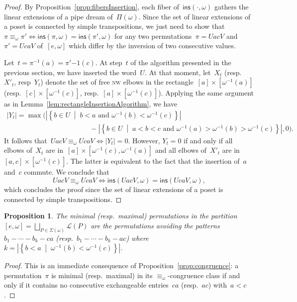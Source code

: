 \documentclass{amsart}
\newtheorem{proposition}[theorem]{Proposition}
\theoremstyle{definition}
\newcommand{\set}[2]{\left\{ #1 \;\middle|\; #2 \right\}} %
\newcommand{\pipeDreams}{\Pi} %
\newcommand{\nw}{\textsc{nw}} %
\newcommand{\insertion}[2]{\mathsf{ins}(#1,#2)} %
\newcommand{\acyclicPipeDreams}{\Sigma} %
\newcommand{\linearExtensions}{\mathcal{L}} %
\begin{document}
\begin{proof}
By Proposition~\ref{prop:fibersInsertion}, each fiber of~$\insertion{\cdot}{\omega}$ gathers the linear extensions of a pipe dream of~$\pipeDreams(\omega)$. Since the set of linear extensions of a poset is connected by simple transpositions, we just need to show that~$\pi \equiv_\omega \pi' \!\iff\! \insertion{\pi}{\omega} = \insertion{\pi'}{\omega}$ for any two permutations~$\pi = UacV$ and~$\pi' = UcaV$ of~$[e,\omega]$ which differ by the inversion of two consecutive values.

Let~$t = \pi^{-1}(a) = \pi'{-1}(c)$. At step~$t$ of the algorithm presented in the previous section, we have inserted the word~$U$. At that moment, let~$X_t$ (resp.~$X'_t$, resp~$Y_t$) denote the set of free \nw{} elbows in the rectangle~$[a] \times [\omega^{-1}(a)]$ (resp.~$[c] \times [\omega^{-1}(c)]$, resp.~$[a] \times [\omega^{-1}(c)]$). Applying the same argument as in Lemma~\ref{lem:rectangleInsertionAlgorithm}, we have
\begin{gather*}
|Y_t| = \max\big( |\set{b \in U}{b < a \text{ and } \omega^{-1}(b) < \omega^{-1}(c)}| \hspace{5cm} \\ \hspace{5cm} - |\set{b \in U}{a < b < c \text{ and } \omega^{-1}(a) > \omega^{-1}(b) > \omega^{-1}(c)}|, 0\big).
\end{gather*}
It follows that~$U ac V \equiv_\omega U ca V \iff |Y_t| = 0$. However, $Y_t = 0$ if and only if all elbows of~$X_t$ are in~$[a] \times [\omega^{-1}(c), \omega^{-1}(a)]$ and all elbows of~$X'_t$ are in~$[a,c] \times [\omega^{-1}(c)]$. The latter is equivalent to the fact that the insertion of~$a$ and~$c$ commute. We conclude that
\[
U ac V \equiv_\omega U ca V \iff \insertion{UacV}{\omega} = \insertion{UcaV}{\omega},
\]
which concludes the proof since the set of linear extensions of a poset is connected by simple transpositions.
\end{proof}

\begin{proposition}
\label{prop:patternAvoiding}
The minimal (resp.~maximal) permutations in the partition
\(
{[e,\omega] = \bigsqcup_{P \in \acyclicPipeDreams(\omega)} \linearExtensions(P)}
\)
are the permutations avoiding the patterns~$b_1 - \cdots - b_k - ca$ (resp.~$b_1 - \cdots - b_k - ac$) where $k = |\set{b < a}{\omega^{-1}(b) < \omega^{-1}(c)}|$.
\end{proposition}

\begin{proof}
This is an immediate consequence of Proposition~\ref{prop:congruence}: a permutation~$\pi$ is minimal (resp.~maximal) in its $\equiv_\omega$-congruence class if and only if it contains no consecutive exchangeable entries~$ca$ (resp.~$ac$) with~$a < c$.
\end{proof}
\end{document}
